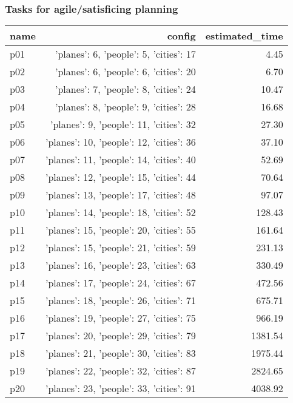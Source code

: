 \documentclass{article}
\begin{document}
                    

                                \subsubsection*{Tasks for agile/satisficing planning}
                                
                            \begin{center}
                            \scriptsize
                            \begin{tabular}{@{}l|r|r@{}}
                            name & config & estimated\_time\\\midrule
                              p01&{'planes': 6, 'people': 5, 'cities': 17}&4.45\\
  p02&{'planes': 6, 'people': 6, 'cities': 20}&6.70\\
  p03&{'planes': 7, 'people': 8, 'cities': 24}&10.47\\
  p04&{'planes': 8, 'people': 9, 'cities': 28}&16.68\\
  p05&{'planes': 9, 'people': 11, 'cities': 32}&27.30\\
  p06&{'planes': 10, 'people': 12, 'cities': 36}&37.10\\
  p07&{'planes': 11, 'people': 14, 'cities': 40}&52.69\\
  p08&{'planes': 12, 'people': 15, 'cities': 44}&70.64\\
  p09&{'planes': 13, 'people': 17, 'cities': 48}&97.07\\
  p10&{'planes': 14, 'people': 18, 'cities': 52}&128.43\\
  p11&{'planes': 15, 'people': 20, 'cities': 55}&161.64\\
  p12&{'planes': 15, 'people': 21, 'cities': 59}&231.13\\
  p13&{'planes': 16, 'people': 23, 'cities': 63}&330.49\\
  p14&{'planes': 17, 'people': 24, 'cities': 67}&472.56\\
  p15&{'planes': 18, 'people': 26, 'cities': 71}&675.71\\
  p16&{'planes': 19, 'people': 27, 'cities': 75}&966.19\\
  p17&{'planes': 20, 'people': 29, 'cities': 79}&1381.54\\
  p18&{'planes': 21, 'people': 30, 'cities': 83}&1975.44\\
  p19&{'planes': 22, 'people': 32, 'cities': 87}&2824.65\\
  p20&{'planes': 23, 'people': 33, 'cities': 91}&4038.92\\

\end{tabular}
\end{center}
\end{document}
